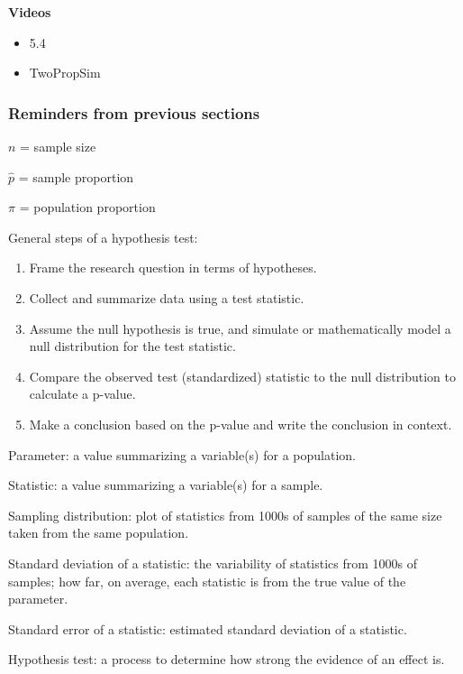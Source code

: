 \documentclass[
]{report}
\providecommand{\tightlist}{%
  \setlength{\itemsep}{0pt}\setlength{\parskip}{0pt}}
\begin{document}
\textbf{Videos}

\begin{itemize}
\tightlist
\item
  5.4
\item
  TwoPropSim
\end{itemize}


\hypertarget{reminders-from-previous-sections-2}{%
\subsubsection*{Reminders from previous sections}\label{reminders-from-previous-sections-2}}

\(n\) = sample size

\(\hat{p}\) = sample proportion

\(\pi\) = population proportion

General steps of a hypothesis test:

\begin{enumerate}
\def\labelenumi{\arabic{enumi}.}
\item
  Frame the research question in terms of hypotheses.
\item
  Collect and summarize data using a test statistic.
\item
  Assume the null hypothesis is true, and simulate or mathematically model a null distribution for the test statistic.
\item
  Compare the observed test (standardized) statistic to the null distribution to calculate a p-value.
\item
  Make a conclusion based on the p-value and write the conclusion in context.
\end{enumerate}

Parameter: a value summarizing a variable(s) for a population.

Statistic: a value summarizing a variable(s) for a sample.

Sampling distribution: plot of statistics from 1000s of samples of the same size taken from the same population.

Standard deviation of a statistic: the variability of statistics from 1000s of samples; how far, on average, each statistic is from the true value of the parameter.

Standard error of a statistic: estimated standard deviation of a statistic.

Hypothesis test: a process to determine how strong the evidence of an effect is.
\end{document}
